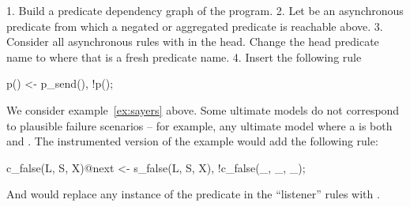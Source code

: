 1. Build a predicate dependency graph of the program.
2. Let  be an asynchronous predicate from which a negated or aggregated predicate is reachable above.
3. Consider all asynchronous rules with  in the head.  Change the head predicate name to  where that is a fresh predicate name.
4. Insert the following rule
\begin{Dedalus}
p() <- p_send(), !p(\dbar{_});
\end{Dedalus}

We consider example~\ref{ex:sayers} above.  Some ultimate models do not correspond to plausible failure scenarios -- for example, any ultimate model where a  is both  and .  The instrumented version of the example would add the following rule:

\begin{Dedalus}
c_false(L, S, X)@next <- s_false(L, S, X),
                         !c_false(_, _, _);
\end{Dedalus}

And would replace any instance of the predicate  in the ``listener'' rules with .
